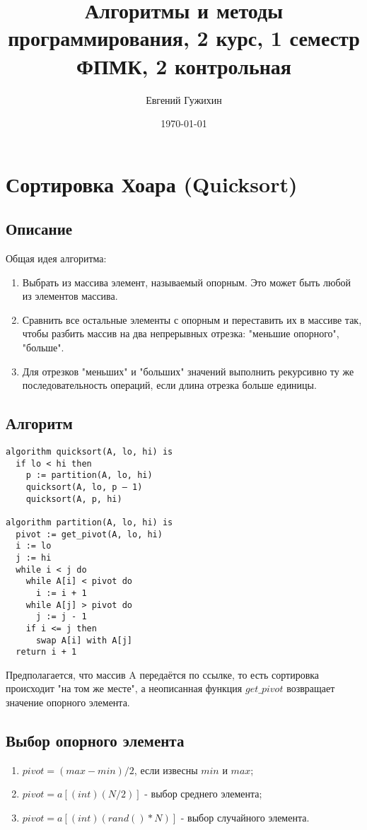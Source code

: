 \documentclass[a5paper,10pt]{article}
\author{Евгений Гужихин}
\title{Алгоритмы и методы программирования, 2 курс, 1 семестр ФПМК, 2 контрольная}
\date{\today}
\begin{document}
	\maketitle

	\tableofcontents{}
	\newpage

	\section{Сортировка Хоара (Quicksort)}
		\subsection{Описание}
			Общая идея алгоритма:
			\begin{enumerate}
				\item Выбрать из массива элемент, называемый опорным. Это может быть любой из элементов массива.
				\item Сравнить все остальные элементы с опорным и переставить их в массиве так, чтобы разбить массив на два непрерывных отрезка: "меньшие опорного", "больше".
				\item Для отрезков "меньших" и "больших" значений выполнить рекурсивно ту же последовательность операций, если длина отрезка больше единицы.
			\end{enumerate}
		
		\subsection{Алгоритм}
			\begin{lstlisting}[frame=single]
algorithm quicksort(A, lo, hi) is
  if lo < hi then
	p := partition(A, lo, hi)
	quicksort(A, lo, p – 1)
	quicksort(A, p, hi)

algorithm partition(A, lo, hi) is
  pivot := get_pivot(A, lo, hi)
  i := lo
  j := hi    
  while i < j do
	while A[i] < pivot do
	  i := i + 1 
	while A[j] > pivot do
	  j := j - 1 
	if i <= j then
	  swap A[i] with A[j]
  return i + 1
			\end{lstlisting}
			Предполагается, что массив A передаётся по ссылке, то есть сортировка происходит "на том же месте", а неописанная функция $get\_pivot$ возвращает значение опорного элемента.

		\subsection{Выбор опорного элемента}
			\begin{enumerate}
				\item $ pivot = (max-min)/2 $, если извесны $ min $ и $ max $;
				\item $ pivot = a[(int)(N/2)] $ - выбор среднего элемента;
				\item $ pivot = a[(int)(rand()*N)] $ - выбор случайного элемента.
			\end{enumerate}
\end{document}
